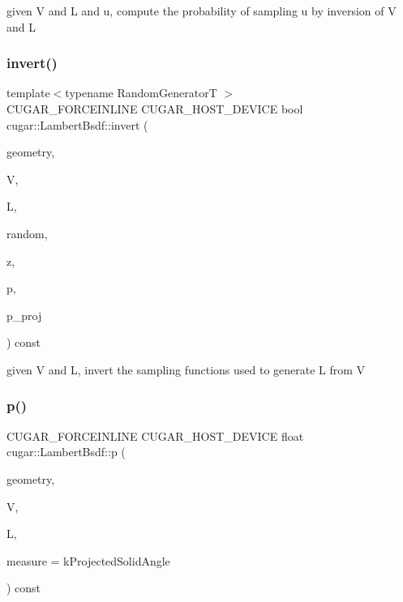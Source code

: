 given V and L and u, compute the probability of sampling u by inversion of V and L \mbox{\label{structcugar_1_1_lambert_bsdf_a5bd701c8aa7b80a0fef18da32ad1d1f4}} 
\subsubsection{\texorpdfstring{invert()}{invert()}}
{\footnotesize\ttfamily template$<$typename Random\+GeneratorT $>$ \\
C\+U\+G\+A\+R\+\_\+\+F\+O\+R\+C\+E\+I\+N\+L\+I\+NE C\+U\+G\+A\+R\+\_\+\+H\+O\+S\+T\+\_\+\+D\+E\+V\+I\+CE bool cugar\+::\+Lambert\+Bsdf\+::invert (\begin{DoxyParamCaption}\item[{const \hyperlink{structcugar_1_1_differential_geometry}{Differential\+Geometry} \&}]{geometry,  }\item[{const \hyperlink{structcugar_1_1_vector}{Vector3f}}]{V,  }\item[{const \hyperlink{structcugar_1_1_vector}{Vector3f}}]{L,  }\item[{Random\+GeneratorT \&}]{random,  }\item[{\hyperlink{structcugar_1_1_vector}{Vector3f} \&}]{z,  }\item[{float \&}]{p,  }\item[{float \&}]{p\+\_\+proj }\end{DoxyParamCaption}) const\hspace{0.3cm}{\ttfamily [inline]}}

given V and L, invert the sampling functions used to generate L from V \mbox{\label{structcugar_1_1_lambert_bsdf_a954a19a6d6fd8d13bc35c65135e15a0a}} 
\subsubsection{\texorpdfstring{p()}{p()}}
{\footnotesize\ttfamily C\+U\+G\+A\+R\+\_\+\+F\+O\+R\+C\+E\+I\+N\+L\+I\+NE C\+U\+G\+A\+R\+\_\+\+H\+O\+S\+T\+\_\+\+D\+E\+V\+I\+CE float cugar\+::\+Lambert\+Bsdf\+::p (\begin{DoxyParamCaption}\item[{const \hyperlink{structcugar_1_1_differential_geometry}{Differential\+Geometry} \&}]{geometry,  }\item[{const \hyperlink{structcugar_1_1_vector}{Vector3f}}]{V,  }\item[{const \hyperlink{structcugar_1_1_vector}{Vector3f}}]{L,  }\item[{const Spherical\+Measure}]{measure = {\ttfamily kProjectedSolidAngle} }\end{DoxyParamCaption}) const\hspace{0.3cm}{\ttfamily [inline]}}

